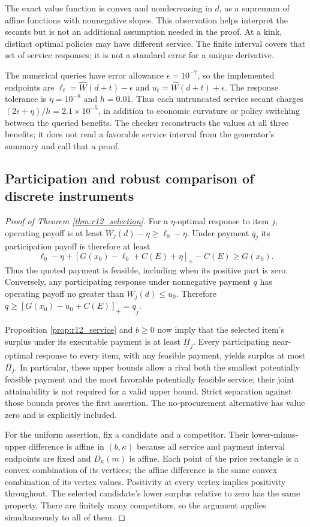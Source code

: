 The exact value function is convex and nondecreasing in $d$, as a supremum of affine functions with nonnegative slopes. This observation helps interpret the secants but is not an additional assumption needed in the proof. At a kink, distinct optimal policies may have different service. The finite interval covers that set of service responses; it is not a standard error for a unique derivative.

The numerical queries have error allowance $\epsilon=10^{-7}$, so the implemented endpoints are $\ell_t=\widehat W(d+t)-\epsilon$ and $u_t=\widehat W(d+t)+\epsilon$. The response tolerance is $\eta=10^{-8}$ and $h=0.01$. Thus each untruncated service secant charges $(2\epsilon+\eta)/h=2.1\times10^{-5}$, in addition to economic curvature or policy switching between the queried benefits. The checker reconstructs the values at all three benefits; it does not read a favorable service interval from the generator's summary and call that a proof.

\subsection{Participation and robust comparison of discrete instruments}
\begin{proof}[Proof of Theorem \ref{thm:r12_selection}]
For a $\eta$-optimal response to item $j$, operating payoff is at least $W_j(d)-\eta\geq\ell_0-\eta$. Under payment $\overline q_j$ its participation payoff is therefore at least
\begin{equation}
 \ell_0-\eta+[G(x_0)-\ell_0+C(E)+\eta]_+-C(E)\geq G(x_0).
\end{equation}
Thus the quoted payment is feasible, including when its positive part is zero. Conversely, any participating response under nonnegative payment $q$ has operating payoff no greater than $W_j(d)\leq u_0$. Therefore
$q\geq[G(x_0)-u_0+C(E)]_+=\underline q_j$.

Proposition \ref{prop:r12_service} and $b\geq0$ now imply that the selected item's surplus under its executable payment is at least $\underline\Pi_j$. Every participating near-optimal response to every item, with any feasible payment, yields surplus at most $\overline\Pi_j$. In particular, these upper bounds allow a rival both the smallest potentially feasible payment and the most favorable potentially feasible service; their joint attainability is not required for a valid upper bound. Strict separation against those bounds proves the first assertion. The no-procurement alternative has value zero and is explicitly included.

For the uniform assertion, fix a candidate and a competitor. Their lower-minus-upper difference is affine in $(b,\kappa)$ because all service and payment interval endpoints are fixed and $D_\kappa(m)$ is affine. Each point of the price rectangle is a convex combination of its vertices; the affine difference is the same convex combination of its vertex values. Positivity at every vertex implies positivity throughout. The selected candidate's lower surplus relative to zero has the same property. There are finitely many competitors, so the argument applies simultaneously to all of them.
\end{proof}

